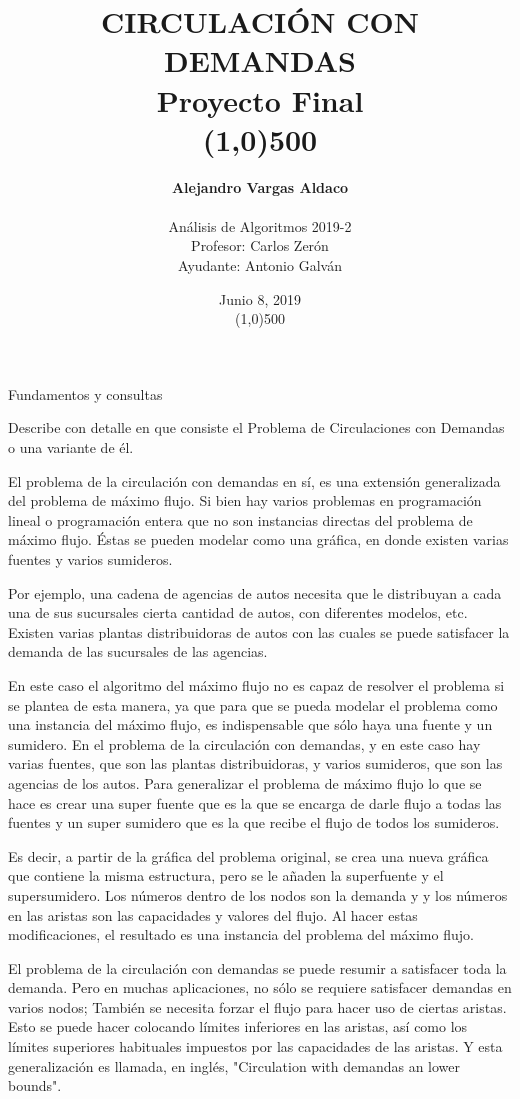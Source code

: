 \documentclass{article}
\title{CIRCULACIÓN CON DEMANDAS \\ Proyecto Final \\ \line(1,0){500}}
\author{
	  \textbf{Alejandro Vargas Aldaco} \\ \\
	  Análisis de Algoritmos 2019-2 \\
	  Profesor: Carlos Zerón \\
	  Ayudante: Antonio Galván
	}
\date{Junio 8, 2019 \\ \line(1,0){500}}
\begin{document}
\maketitle

\setlength{\parindent}{0cm} 
\setlength{\parskip}{.4cm}


\begin{section} {Fundamentos y consultas}
	
	\begin{subsection}{Describe con detalle en que consiste el Problema de Circulaciones con Demandas o una variante de él.}
		
		El problema de la circulación con demandas en sí, es una extensión generalizada del problema de máximo flujo. Si bien hay varios problemas en programación lineal o programación entera que no son instancias directas del problema de máximo flujo. Éstas se pueden modelar como una gráfica, en donde existen varias fuentes y varios sumideros.
		
		Por ejemplo, una cadena de agencias de autos necesita que le distribuyan a cada una de sus sucursales cierta cantidad de autos, con diferentes modelos, etc. Existen varias plantas distribuidoras de autos con las cuales se puede satisfacer la demanda de las sucursales de las agencias.
		
		En este caso el algoritmo del máximo flujo no es capaz de resolver el problema si se plantea de esta manera, ya que para que se pueda modelar el problema como una instancia del máximo flujo, es indispensable que sólo haya una fuente y un sumidero. En el problema de la circulación con demandas, y en este caso hay varias fuentes, que son las plantas distribuidoras, y varios sumideros, que son las agencias de los autos.  Para generalizar el problema de máximo flujo lo que se hace es crear una super fuente que es la que se encarga de darle flujo a todas las fuentes y un super sumidero que es la que recibe el flujo de todos los sumideros. 
		
		Es decir, a partir de la gráfica del problema original, se crea una nueva gráfica que contiene la misma estructura, pero se le añaden la superfuente y el supersumidero. Los números dentro de los nodos son la demanda y y los números en las aristas son las capacidades y valores del flujo. Al hacer estas modificaciones, el resultado es una instancia del problema del máximo flujo.
		
		El problema de la circulación con demandas se puede resumir a satisfacer toda la demanda. Pero en muchas aplicaciones, no sólo se requiere satisfacer demandas en varios nodos; También se necesita forzar el flujo para hacer uso de ciertas aristas. Esto se puede hacer colocando límites inferiores en las aristas, así como los límites superiores habituales impuestos por las capacidades de las aristas. Y esta generalización es llamada, en inglés, "Circulation with demandas an lower bounds".
		

\end{subsection}
\end{section}
\end{document}
